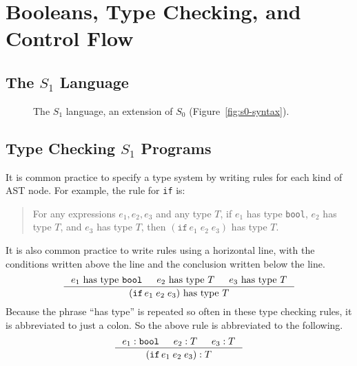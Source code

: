 \documentclass[12pt]{book}
\newcommand{\itm}[1]{\ensuremath{\mathit{#1}}}
\newcommand{\Exp}{\itm{exp}}
\newcommand{\Op}{\itm{op}}
\newcommand{\key}[1]{\texttt{#1}}
\newcommand{\IF}[3]{(\key{if}\,#1\;#2\;#3)}
\begin{document}
\chapter{Booleans, Type Checking, and Control Flow}
\label{ch:bool-types}

\section{The $S_1$ Language}

\begin{figure}[htbp]
\centering
\fbox{
\begin{minipage}{0.85\textwidth}
\[
\begin{array}{lcl}
  \Op  &::=& \ldots \mid \key{and} \mid \key{or} \mid \key{not} \mid \key{eq?} \\
  \Exp &::=& \ldots \mid \key{\#t} \mid \key{\#f} \mid
      \IF{\Exp}{\Exp}{\Exp}
\end{array}
\]
\end{minipage}
}
\caption{The $S_1$ language, an extension of $S_0$
  (Figure~\ref{fig:s0-syntax}).}
\label{fig:s1-syntax}
\end{figure}

\section{Type Checking $S_1$ Programs}


It is common practice to specify a type system by writing rules for
each kind of AST node. For example, the rule for \key{if} is:
\begin{quote}
  For any expressions $e_1, e_2, e_3$ and any type $T$, if $e_1$ has
  type \key{bool}, $e_2$ has type $T$, and $e_3$ has type $T$, then
  $\IF{e_1}{e_2}{e_3}$ has type $T$.
\end{quote}
It is also common practice to write rules using a horizontal line,
with the conditions written above the line and the conclusion written
below the line.
\begin{equation*}
  \inference{e_1 \text{ has type } \key{bool} & 
        e_2 \text{ has type } T & e_3 \text{ has type } T}
  {\IF{e_1}{e_2}{e_3} \text{ has type } T}
\end{equation*}
Because the phrase ``has type'' is repeated so often in these type
checking rules, it is abbreviated to just a colon. So the above rule
is abbreviated to the following.
\begin{equation*}
  \inference{e_1 : \key{bool} & e_2 : T & e_3 : T}
            {\IF{e_1}{e_2}{e_3} : T}
\end{equation*}
\end{document}
